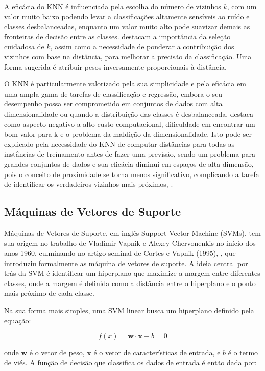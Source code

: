 A eficácia do KNN é influenciada pela escolha do número de vizinhos $k$, com um valor muito baixo podendo levar a classificações altamente sensíveis ao ruído e classes desbalanceadas, enquanto um valor muito alto pode suavizar demais as fronteiras de decisão entre as classes.  \cite{bhavani2021review} destacam a importância da seleção cuidadosa de $k$, assim como a necessidade de ponderar a contribuição dos vizinhos com base na distância, para melhorar a precisão da classificação.  Uma forma sugerida é atribuir pesos inversamente proporcionais à distância.


O KNN é particularmente valorizado pela sua simplicidade e pela eficácia em uma ampla gama de tarefas de classificação e regressão, embora o seu desempenho possa ser comprometido em conjuntos de dados com alta dimensionalidade ou quando a distribuição das classes é desbalanceada. \cite{kowsari2019text} destaca como aspecto negativo a alto custo computacional, dificuldade em encontrar um bom valor para k e o problema da maldição da dimensionalidade.  Isto pode ser explicado pela necessidade do KNN de computar distâncias para todas as instâncias de treinamento antes de fazer uma previsão, sendo um problema para grandes conjuntos de dados e sua eficácia diminui em espaços de alta dimensão, pois o conceito de proximidade se torna menos significativo, complicando a tarefa de identificar os verdadeiros vizinhos mais próximos, \cite{hastie2009elements}.

\subsection{Máquinas de Vetores de Suporte}

Máquinas de Vetores de Suporte, em inglês Support Vector Machine (SVMs), tem sua origem no trabalho de Vladimir Vapnik e Alexey Chervonenkis no início dos anos 1960, culminando no artigo seminal de Cortes e Vapnik (1995), \cite{cortes1995support}, que introduziu formalmente as máquina de vetores de suporte. A ideia central por trás da SVM é identificar um hiperplano que maximize a margem entre diferentes classes, onde a margem é definida como a distância entre o hiperplano e o ponto mais próximo de cada classe.

Na sua forma mais simples, uma SVM linear busca um hiperplano definido pela equação:

\[
f(x) = \mathbf{w} \cdot \mathbf{x} + b = 0
\]

onde \(\mathbf{w}\) é o vetor de peso, \(\mathbf{x}\) é o vetor de características de entrada, e \(b\) é o termo de viés. A função de decisão que classifica os dados de entrada é então dada por:

